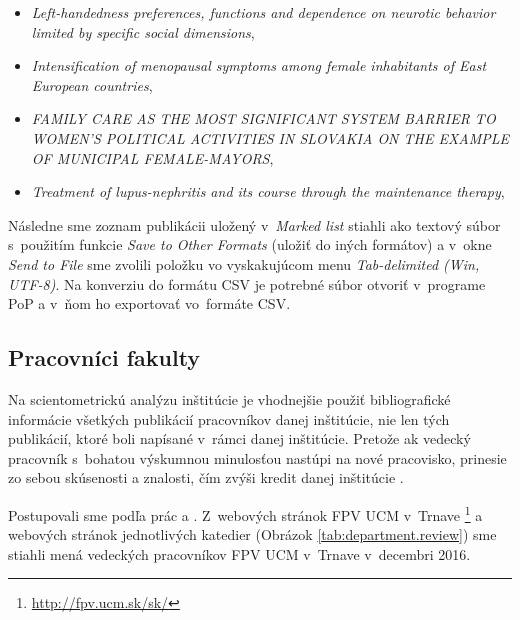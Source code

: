 \begin{itemize}
\item \emph{Left-handedness preferences, functions and dependence on neurotic
    behavior limited by specific social dimensions},
\item \emph{Intensification of menopausal symptoms among female inhabitants of
    East European countries},
\item \emph{FAMILY CARE AS THE MOST SIGNIFICANT SYSTEM BARRIER TO WOMEN'S
    POLITICAL ACTIVITIES IN SLOVAKIA ON THE EXAMPLE OF MUNICIPAL FEMALE-MAYORS},
\item \emph{Treatment of lupus-nephritis and its course through the maintenance
    therapy},
\end{itemize}

Následne sme zoznam publikácii uložený v~\emph{Marked list} stiahli ako textový
súbor s~použitím funkcie \emph{Save to Other Formats} (uložiť do iných formátov)
a v~okne \emph{Send to File} sme zvolili položku vo vyskakujúcom menu
\emph{Tab-delimited (Win, UTF-8)}. Na konverziu do formátu CSV je potrebné súbor
otvoriť v~programe PoP \citep{Harzing2011} a v~ňom ho exportovať vo~formáte CSV.


\subsection{Pracovníci fakulty}
\label{sec:staff.mining}

Na scientometrickú analýzu inštitúcie je vhodnejšie použiť bibliografické
informácie všetkých publikácií pracovníkov danej inštitúcie, nie len tých
publikácií, ktoré boli napísané v~rámci danej inštitúcie. Pretože ak vedecký
pracovník s~bohatou výskumnou minulosťou nastúpi na nové pracovisko, prinesie zo
sebou skúsenosti a znalosti, čím zvýši kredit danej inštitúcie
\citep{Altanopoulou2012}.

Postupovali sme podľa prác \citet{Kazakis2014a} a
\citet{Kazakis2014b,Kazakis2015}.  Z~webových stránok FPV UCM v~Trnave
\footnote{\url{http://fpv.ucm.sk/sk/}} a webových stránok jednotlivých katedier
(Obrázok \ref{tab:department.review}) sme stiahli mená vedeckých pracovníkov FPV
UCM v~Trnave v~decembri 2016.

